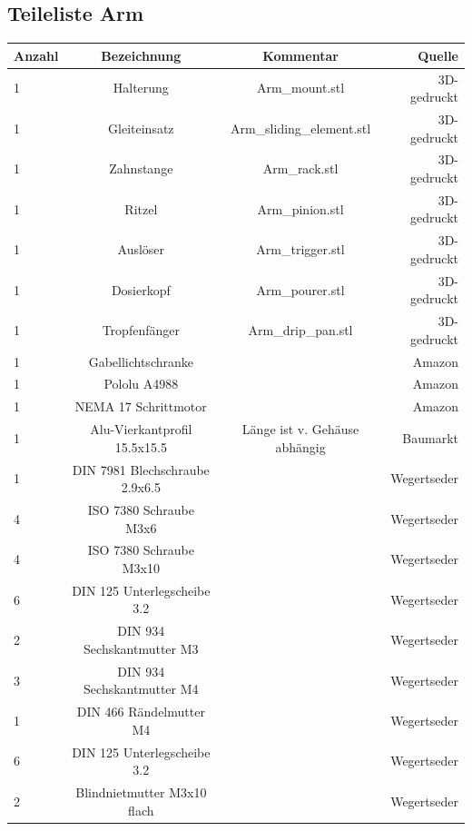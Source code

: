 \documentclass[12pt,letterpaper]{article}
\begin{document}
	\subsection{Teileliste Arm}
    \begin{tabular}{|l|c|c|r|}
    \hline
        Anzahl & Bezeichnung & Kommentar & Quelle \\ \hline
        1 & Halterung & Arm\_mount.stl & 3D-gedruckt \\ \hline
        1 & Gleiteinsatz & Arm\_sliding\_element.stl & 3D-gedruckt \\ \hline
        1 & Zahnstange & Arm\_rack.stl & 3D-gedruckt \\ \hline
        1 & Ritzel & Arm\_pinion.stl & 3D-gedruckt \\ \hline
        1 & Auslöser & Arm\_trigger.stl & 3D-gedruckt \\ \hline
        1 & Dosierkopf & Arm\_pourer.stl & 3D-gedruckt \\ \hline
        1 & Tropfenfänger & Arm\_drip\_pan.stl & 3D-gedruckt \\ \hline
        1 & Gabellichtschranke & ~ & Amazon \\ \hline
        1 & Pololu A4988 & ~ & Amazon \\ \hline
        1 & NEMA 17 Schrittmotor & ~ & Amazon \\ \hline
        1 & Alu-Vierkantprofil 15.5x15.5 & Länge ist v. Gehäuse abhängig & Baumarkt \\ \hline
        1 & DIN 7981 Blechschraube 2.9x6.5 & ~ & Wegertseder \\ \hline
        4 & ISO 7380 Schraube M3x6 & ~ & Wegertseder \\ \hline
        4 & ISO 7380 Schraube M3x10 & ~ & Wegertseder \\ \hline
        6 & DIN 125 Unterlegscheibe 3.2 & ~ & Wegertseder \\ \hline
        2 & DIN 934 Sechskantmutter M3 & ~ & Wegertseder \\ \hline
        3 & DIN 934 Sechskantmutter M4 & ~ & Wegertseder \\ \hline
        1 & DIN 466 Rändelmutter M4 & ~ & Wegertseder \\ \hline
        6 & DIN 125 Unterlegscheibe 3.2 & ~ & Wegertseder \\ \hline
        2 & Blindnietmutter M3x10 flach & ~ & Wegertseder \\ \hline
    \end{tabular}
    
\end{document}

